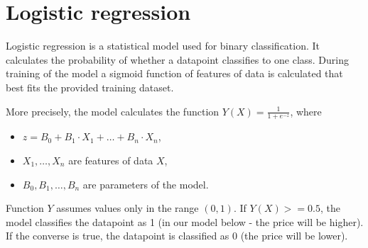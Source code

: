 
















\section{Logistic regression}

Logistic regression \cite{logistic_regression} is a statistical model used for binary classification.
It calculates the probability of whether a datapoint classifies to one class.
During training of the model a sigmoid function of features of data is calculated that best fits the provided training dataset.

More precisely, the model calculates the function \(Y(X) = \frac{1}{1+e^{-z}}\), where
\begin{itemize}
	\item \(z = B_0 + B_1\cdot X_1 + \ldots + B_n\cdot X_n\),
	\item \(X_1, \ldots, X_n\) are features of data \(X\),
	\item \(B_0, B_1, \ldots, B_n\) are parameters of the model.
\end{itemize}
Function \(Y\) assumes values only in the range \((0,1)\).
If \(Y(X) >= 0.5\), the model classifies the datapoint as 1 (in our model below - the price will be higher). If the converse is true, the datapoint is classified as 0 (the price will be lower).

